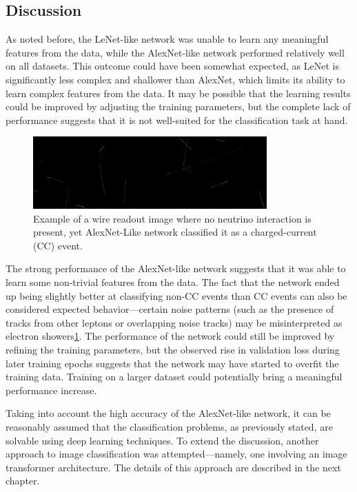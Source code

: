 \documentclass{pracalicmgr}
\begin{document}
\newpage

\subsection{Discussion}

As noted before, the LeNet-like network was unable to learn any meaningful features from the data, while the AlexNet-like network performed relatively well on all datasets. This outcome could have been somewhat expected, as LeNet is significantly less complex and shallower than AlexNet, which limits its ability to learn complex features from the data. It may be possible that the learning results could be improved by adjusting the training parameters, but the complete lack of performance suggests that it is not well-suited for the classification task at hand.

\begin{figure}[H]
    \centering
    \includegraphics[width=0.8\textwidth]{src/without_flag_20.png}
    \caption{Example of a wire readout image where no neutrino interaction is present, yet AlexNet-Like network classified it as a charged-current (CC) event.}
    \label{fig:without_flag}
\end{figure}

The strong performance of the AlexNet-like network suggests that it was able to learn some non-trivial features from the data.  The fact that the network ended up being slightly better at classifying non-CC events than CC events can also be considered expected behavior—certain noise patterns (such as the presence of tracks from other leptons or overlapping noise tracks) may be misinterpreted as electron showers\ref{fig:without_flag}. The performance of the network could still be improved by refining the training parameters, but the observed rise in validation loss during later training epochs suggests that the network may have started to overfit the training data. Training on a larger dataset could potentially bring a meaningful performance increase.

Taking into account the high accuracy of the AlexNet-like network, it can be reasonably assumed that the classification problems, as previously stated, are solvable using deep learning techniques. To extend the discussion, another approach to image classification was attempted—namely, one involving an image transformer architecture. The details of this approach are described in the next chapter.
\end{document}
